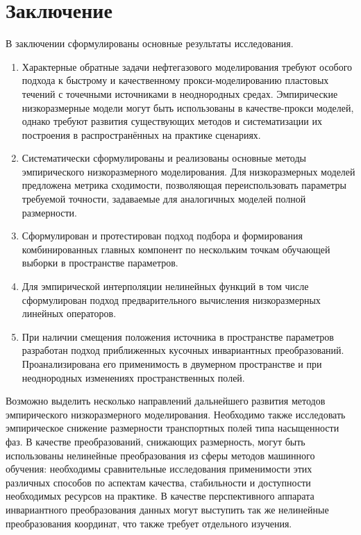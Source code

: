 \chapter*{Заключение}                       %

В заключении сформулированы основные результаты исследования.
\begin{enumerate}
    \item Характерные обратные задачи нефтегазового моделирования требуют особого подхода к быстрому и качественному прокси-моделированию пластовых течений с точечными источниками в неоднородных средах. Эмпирические низкоразмерные модели могут быть использованы в качестве-прокси моделей, однако требуют развития существующих методов и систематизации их построения в распространённых на практике сценариях.
    \item Систематически сформулированы и реализованы основные методы эмпирического низкоразмерного моделирования. Для низкоразмерных моделей предложена метрика сходимости, позволяющая переиспользовать параметры требуемой точности, задаваемые для аналогичных моделей полной размерности.
    \item Сформулирован и протестирован подход подбора и формирования комбинированных главных компонент по нескольким точкам обучающей выборки в пространстве параметров.
    \item Для эмпирической интерполяции нелинейных функций в том числе сформулирован подход предварительного вычисления низкоразмерных линейных операторов.
    \item При наличии смещения положения источника в пространстве параметров разработан подход приближенных кусочных инвариантных преобразований. Проанализирована его применимость в двумерном пространстве и при неоднородных изменениях пространственных полей.
\end{enumerate}

Возможно выделить несколько направлений дальнейшего развития методов эмпирического низкоразмерного моделирования. Необходимо также исследовать эмпирическое снижение размерности транспортных полей типа насыщенности фаз. В качестве преобразований, снижающих размерность, могут быть использованы нелинейные преобразования из сферы методов машинного обучения: необходимы сравнительные исследования применимости этих различных способов по аспектам качества, стабильности и доступности необходимых ресурсов на практике. В качестве перспективного аппарата инвариантного преобразования данных могут выступить так же нелинейные преобразования координат, что также требует отдельного изучения.
